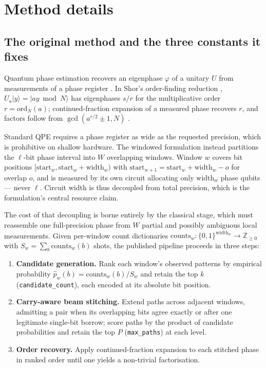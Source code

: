 \documentclass[preprint,11pt]{elsarticle}
\begin{document}
\section{Method details}

\subsection{The original method and the three constants it fixes}
\label{sec:baseline}

Quantum phase estimation recovers an eigenphase $\varphi$ of a unitary
$U$ from measurements of a phase register \cite{kitaev1995,cleve1998}.
In Shor's order-finding reduction \cite{shor1997}, $U_a\lvert
y\rangle=\lvert ay \bmod N\rangle$ has eigenphases $s/r$ for the
multiplicative order $r=\mathrm{ord}_N(a)$; continued-fraction expansion
of a measured phase recovers $r$, and factors follow from
$\gcd(a^{r/2}\pm1,N)$ \cite{nielsenchuang}.

Standard QPE requires a phase register as wide as the requested
precision, which is prohibitive on shallow hardware. The windowed
formulation \cite{wqpe2025,modularshor2025} instead partitions the
$\ell$-bit phase interval into $W$ overlapping windows. Window $w$
covers bit positions $[\mathrm{start}_w,\mathrm{start}_w+\mathrm{width}_w)$
with $\mathrm{start}_{w+1}=\mathrm{start}_w+\mathrm{width}_w-o$ for
overlap $o$, and is measured by its own circuit allocating only
$\mathrm{width}_w$ phase qubits --- never $\ell$. Circuit width is thus
decoupled from total precision, which is the formulation's central
resource claim.

The cost of that decoupling is borne entirely by the classical stage,
which must reassemble one full-precision phase from $W$ partial and
possibly ambiguous local measurements. Given per-window count
dictionaries $\mathrm{counts}_w:\{0,1\}^{\mathrm{width}_w}\to
\mathbb{Z}_{\geq0}$ with $S_w=\sum_b \mathrm{counts}_w(b)$ shots, the
published pipeline proceeds in three steps:

\begin{enumerate}\itemsep1pt
\item \textbf{Candidate generation.} Rank each window's observed patterns
by empirical probability $\hat p_w(b)=\mathrm{counts}_w(b)/S_w$ and
retain the top $k$ (\texttt{candidate\_count}), each encoded at its
absolute bit position.
\item \textbf{Carry-aware beam stitching.} Extend paths across adjacent
windows, admitting a pair when its overlapping bits agree exactly or
after one legitimate single-bit borrow; score paths by the product of
candidate probabilities and retain the top $P$ (\texttt{max\_paths}) at
each level.
\item \textbf{Order recovery.} Apply continued-fraction expansion to each
stitched phase in ranked order until one yields a non-trivial
factorisation.
\end{enumerate}
\end{document}
